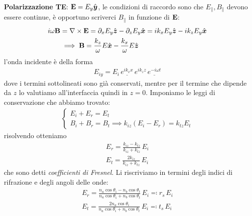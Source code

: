 \textbf{Polarizzazione TE}: $ \mathbf{E} = E_y \hat{\boldsymbol{y}} $, le condizioni di raccordo sono che $ E_\parallel,B_\parallel $ devono essere continue, è opportuno 
scriverci $ B_\parallel $ in funzione di $ \mathbf{E} $:
\begin{align}
  i\omega \mathbf{B} &= \nabla \times \mathbf{E} = \partial_x E_y \hat{\boldsymbol{z}} - \partial_z E_y \hat{\boldsymbol{x}} = i k_x E_y \hat{\boldsymbol{z}} - ik_z E_y \hat{\boldsymbol{x}}
  \\
  &\implies \mathbf{B} = \frac{k_z}{\omega} E \hat{\boldsymbol{x}} - \frac{k_x}{\omega} E \hat{\boldsymbol{z}}
\end{align}
l'onda incidente è della forma
\begin{align}
  E_{iy} = E_i \, \underline{e^{ik_x x}}\, e^{ik_z z}\, \underline{e^{-i\omega t} }
\end{align}
dove i termini sottolineati sono già conservati, mentre per il termine che dipende da $ z $ lo valutiamo all'interfaccia quindi in $ z = 0 $. 
Imponiamo le leggi di conservazione che abbiamo trovato:
\begin{align}
  \begin{cases}
    E_i + E_r = E_t  \\
    B_i + B_r = B_t \implies k_{iz} (E_i - E_r) = k_{tz} E_t
  \end{cases}
\end{align}
risolvendo otteniamo 
\begin{align}
  E_r = \frac{k_{iz} - k_{tz}}{k_{iz} + k_{tz}}\, E_i
  \\
  E_t = \frac{2k_{iz}}{k_{iz} + k_{tz}}\, E_i
\end{align}
che sono detti \textit{coefficienti di Fresnel}. Li riscriviamo in termini degli indici di rifrazione e degli angoli delle onde:
\begin{align}
  E_r = \frac{n_a \cos\theta_i - n_b \cos\theta_t}{n_a \cos\theta_i + n_b \cos\theta_t}\, E_i \eqcolon r_s \,E_i
  \\
  E_t = \frac{2 n_a \cos \theta_i}{n_a \cos\theta_i + n_b \cos\theta_t}\, E_i \eqcolon t_s \,E_i
\end{align}

